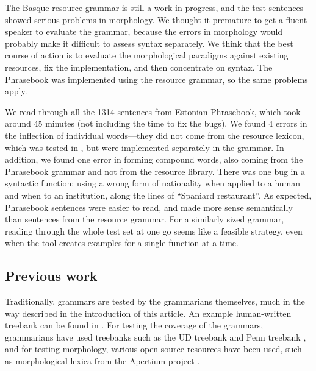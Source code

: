 The Basque resource grammar is still a work in progress, and the
test sentences showed serious problems in morphology.
We thought it premature to get a fluent speaker to evaluate the grammar,
because the errors in morphology would probably make it
difficult to assess syntax separately. We think that the best course
of action is to evaluate the morphological paradigms against existing
resources, fix the implementation, and then concentrate on syntax.
The Phrasebook was implemented using the resource grammar, so the
same problems apply.

We read through all the 1314 sentences from Estonian Phrasebook,
which took around 45 minutes (not including the time to fix the bugs).
We found 4 errors in the inflection of individual words---they did not
come from the resource lexicon, which was tested in
\cite{listenmaa_kaljurand2014}, but were implemented separately in the
grammar. In addition, we found one error in forming compound words,
also coming from the Phrasebook grammar and not from the resource
library. There was one bug in a syntactic function: using a wrong form
of nationality when applied to a human and when to an institution,
along the lines of ``Spaniard restaurant''. As expected, Phrasebook
sentences were easier to read, and made more sense semantically than
sentences from the resource grammar. For a similarly sized grammar,
reading through the whole test set at one go seems like a feasible
strategy, even when the tool creates examples for a single function at
a time.

\subsection{Previous work}

Traditionally, \gf{} grammars are tested by the grammarians themselves,
much in the way described in the introduction of this article. An example
human-written treebank can be found in \cite[p.~136--142]{khegai2006phd}.
For testing the coverage of the grammars, grammarians have used
treebanks such as the UD treebank \cite{nivre2016ud} and Penn treebank
\cite{marcus1993penntreebank}, and for testing morphology, various open-source resources
have been used, such as morphological lexica from the Apertium
project \cite{forcada2011apertium}.



